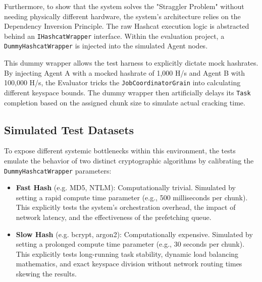 Furthermore, to show that the system solves the "Straggler Problem" without needing physically different hardware, the system's architecture relies on the Dependency Inversion Principle. The raw Hashcat execution logic is abstracted behind an \verb|IHashcatWrapper| interface. Within the evaluation project, a \verb|DummyHashcatWrapper| is injected into the simulated Agent nodes. 

This dummy wrapper allows the test harness to explicitly dictate mock hashrates. By injecting Agent A with a mocked hashrate of 1,000 H/s and Agent B with 100,000 H/s, the Evaluator tricks the \verb|JobCoordinatorGrain| into calculating different keyspace bounds. The dummy wrapper then artificially delays its \verb|Task| completion based on the assigned chunk size to simulate actual cracking time.

\subsection{Simulated Test Datasets}
To expose different systemic bottlenecks within this environment, the tests emulate the behavior of two distinct cryptographic algorithms by calibrating the \verb|DummyHashcatWrapper| parameters:
\begin{itemize}
    \item \textbf{Fast Hash} (e.g. MD5, NTLM): Computationally trivial. Simulated by setting a rapid compute time parameter (e.g., 500 milliseconds per chunk). This explicitly tests the system's orchestration overhead, the impact of network latency, and the effectiveness of the prefetching queue.
    \item \textbf{Slow Hash} (e.g. bcrypt, argon2): Computationally expensive. Simulated by setting a prolonged compute time parameter (e.g., 30 seconds per chunk). This explicitly tests long-running task stability, dynamic load balancing mathematics, and exact keyspace division without network routing times skewing the results.
\end{itemize}

